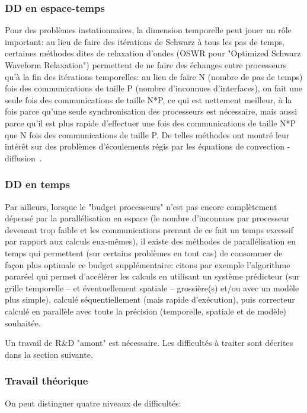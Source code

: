 \subsubsection{DD en espace-temps}
Pour des probl\`emes instationnaires, la dimension temporelle peut jouer un r\^ole important: au lieu de faire des it\'erations de Schwarz \`a tous les pas de temps, certaines m\'ethodes dites de relaxation d'ondes (OSWR pour "Optimized Schwarz Waveform Relaxation") permettent de ne faire des \'echanges entre processeurs qu'\`a la fin des it\'erations temporelles: au lieu de faire N (nombre de pas de temps) fois des communications de taille P (nombre d'inconnues d'interfaces), on fait une seule fois des communications de taille N*P, ce qui est nettement meilleur, \`a la fois parce qu'une seule synchronisation des processeurs est n\'ecessaire, mais aussi parce qu'il est plus rapide d'effectuer une fois des communications de taille N*P que N fois des communications de taille P. De telles m\'ethodes ont montr\'e leur int\'er\^et sur des probl\`emes d'\'ecoulements r\'egis par les \'equations de convection - diffusion~\cite{japhet2017space}.

\subsubsection{DD en temps}
Par ailleurs, lorsque le "budget processeurs" n'est pas encore compl\`etement d\'epens\'e par la parall\'elisation en espace (le nombre d'inconnues par processeur devenant
trop faible et les communications prenant de ce fait un temps excessif par rapport aux calculs eux-m\^emes), il existe des m\'ethodes de parall\'elisation en temps qui
permettent (sur certains probl\`emes en tout cas) de consommer de fa\c con plus optimale ce budget suppl\'ementaire: citons par exemple l'algorithme parar\'eel qui permet d'acc\'el\'erer les calculs en utilisant un syst\`eme pr\'edicteur (sur grille temporelle  -- et \'eventuellement spatiale -- grossi\`ere(s) et/ou avec un mod\`ele plus simple), calcul\'e s\'equentiellement (mais rapide d'ex\'ecution), puis correcteur calcul\'e en parall\`ele avec toute la pr\'ecision (temporelle, spatiale et de mod\`ele) souhait\'ee.

Un travail de R\&D "amont" est n\'ecessaire. Les difficult\'es \`a traiter sont d\'ecrites dans la section suivante.

\subsubsection{Travail th\'eorique}
\label{DD-temps-th\'eorie}
On peut distinguer quatre niveaux de difficult\'es:

